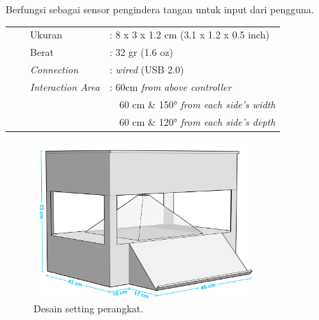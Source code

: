 \begin{enumerate}[nolistsep]
			Berfungsi sebagai sensor pengindera tangan untuk input dari pengguna\cite{leapmotion_ds}.
			\vspace{-2ex}
			\begin{table}[H]
				\begin{flushleft}
				\begin{tabular}{L{0.5cm} l L{2.55cm} l}
					&\textbullet & Ukuran  						& : 8 x 3 x 1.2 cm (3.1 x 1.2 x 0.5 inch) \\	
					&\textbullet & Berat						& : 32 gr (1.6 oz) \\
					&\textbullet & \textit{Connection} 			& : \textit{wired} (USB 2.0)\\
					&\textbullet & \textit{Interaction Area} 	& : 60cm \textit{from above controller}\\
					&  &  &  \         \      60 cm \& 150° \textit{from each side's width}  \\	
					&  &  &  \         \     60 cm \& 120° \textit{from each side's depth}   \\	
				\end{tabular}
				\end{flushleft}
			\end{table}
			\vspace{-3.5ex}
		\end{enumerate}
		\vspace{-2ex}
		\begin{figure} [H]
			\includegraphics[width=0.75\textwidth]{img/bab3/desain_perangkat.png}
			\caption{Desain setting perangkat.}
			\label{fig:desain_setting}
		\end{figure}
		\vspace{-2ex}
